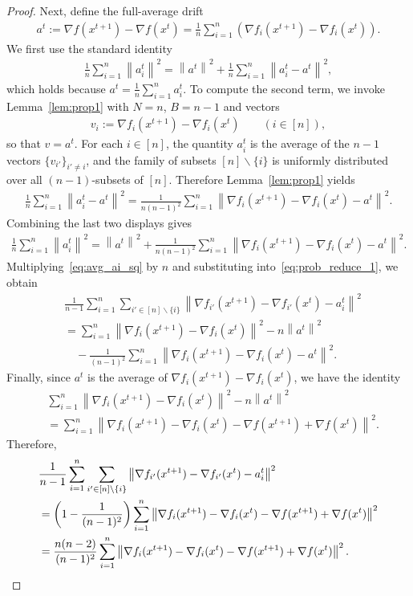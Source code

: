 \documentclass{article}
\newcommand{\sqn}[1]{\left\| #1 \right\|^2}
\newcommand{\eqdef}{:=}
\theoremstyle{plain}
\begin{document}
\begin{proof}
Next, define the full-average drift
\begin{align*}
a^{t}\eqdef \nabla f(x^{t+1})-\nabla f(x^{t})
=\frac{1}{n}\sum_{i=1}^n \left(\nabla f_i(x^{t+1})-\nabla f_i(x^{t})\right).
\end{align*}
We first use the standard identity
\begin{align*}
\frac{1}{n}\sum_{i=1}^n \sqn{a_i^t}
=\sqn{a^t}+\frac{1}{n}\sum_{i=1}^n \sqn{a_i^t-a^t},
\end{align*}
which holds because $a^t=\frac{1}{n}\sum_{i=1}^n a_i^t$.
To compute the second term, we invoke Lemma~\ref{lem:prop1} with $N=n$, $B=n-1$ and vectors
\begin{align*}
v_i \eqdef \nabla f_i(x^{t+1})-\nabla f_i(x^{t})\qquad (i\in[n]),
\end{align*}
so that $v=a^t$. For each $i\in[n]$, the quantity $a_i^t$ is the average of the $n-1$ vectors $\{v_{i'}\}_{i'\neq i}$,
and the family of subsets $[n]\backslash\{i\}$ is uniformly distributed over all $(n-1)$-subsets of $[n]$.
Therefore Lemma~\ref{lem:prop1} yields
\begin{align*}
\frac{1}{n}\sum_{i=1}^n \sqn{a_i^t-a^t}
=\frac{1}{n(n-1)^2}\sum_{i=1}^n \sqn{\nabla f_{i}(x^{t+1})-\nabla f_{i}(x^{t})-a^t}.
\end{align*}
Combining the last two displays gives
\begin{align}
\frac{1}{n}\sum_{i=1}^n \sqn{a_i^t}
=\sqn{a^t}+\frac{1}{n(n-1)^2}\sum_{i=1}^n \sqn{\nabla f_{i}(x^{t+1})-\nabla f_{i}(x^{t})-a^t}.
\label{eq:avg_ai_sq}
\end{align}
Multiplying~\eqref{eq:avg_ai_sq} by $n$ and substituting into~\eqref{eq:prob_reduce_1}, we obtain
\begin{align*}
&\frac{1}{n-1}\sum_{i=1}^n\sum_{i'\in [n]\backslash\{i\}}
\sqn{\nabla f_{i'}(x^{t+1})-\nabla f_{i'}(x^{t})-a_i^t}\\
&=\sum_{i=1}^n\sqn{\nabla f_{i}(x^{t+1})-\nabla f_{i}(x^{t})}-n\sqn{a^t} \\
&\quad-\frac{1}{(n-1)^2}\sum_{i=1}^n \sqn{\nabla f_{i}(x^{t+1})-\nabla f_{i}(x^{t})-a^t}.
\end{align*}
Finally, since $a^t$ is the average of $\nabla f_i(x^{t+1})-\nabla f_i(x^{t})$, we have the identity
\begin{align*}
&\sum_{i=1}^n\sqn{\nabla f_{i}(x^{t+1})-\nabla f_{i}(x^{t})}-n\sqn{a^t} \\
&=\sum_{i=1}^n\sqn{\nabla f_{i}(x^{t+1})-\nabla f_{i}(x^{t})-\nabla f(x^{t+1})+\nabla f(x^{t})}.
\end{align*}
Therefore,
\begin{align}
&\frac{1}{n-1}\sum_{i=1}^n\sum_{i'\in [n]\backslash\{i\}}
\sqn{\nabla f_{i'}(x^{t+1})-\nabla f_{i'}(x^{t})-a_i^t}\notag\\
&=\left(1-\frac{1}{(n-1)^2}\right)
\sum_{i=1}^n\sqn{\nabla f_{i}(x^{t+1})-\nabla f_{i}(x^{t})-\nabla f(x^{t+1})+\nabla f(x^{t})}\notag\\
&=\frac{n(n-2)}{(n-1)^2}\sum_{i=1}^n\sqn{\nabla f_{i}(x^{t+1})-\nabla f_{i}(x^{t})-\nabla f(x^{t+1})+\nabla f(x^{t})}.
\label{eq:prob_reduce_final}
\end{align}


\end{proof}
\end{document}
